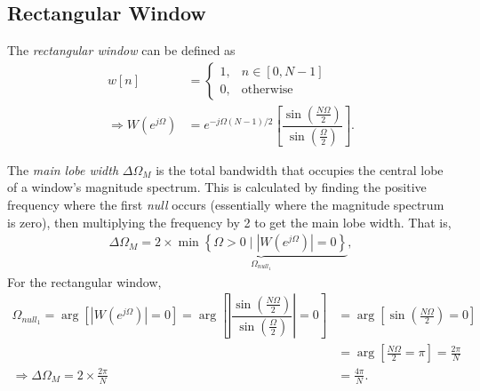 \documentclass{report}
\begin{document}
\subsection{Rectangular Window}
The \emph{rectangular window} can be defined as 
\begin{align}
    w[n] &= \begin{cases}
        1, & n\in[0,N-1] \\
        0, & \text{otherwise}
    \end{cases} \\
    \Longrightarrow W(e^{j\Omega}) &= e^{-j\Omega(N-1)/2}\left[\dfrac{\sin\left(\frac{N\Omega}{2}\right)}{\sin\left(\frac{\Omega}{2}\right)}\right].
\end{align}
\begin{center}
\end{center}
The \emph{main lobe width} $\Delta\Omega_M$ is the total bandwidth that occupies the central lobe of a window's magnitude spectrum. This is calculated by finding the positive frequency where the first \emph{null} occurs (essentially where the magnitude spectrum is zero), then 
multiplying the frequency by 2 to get the main lobe width. That is, 
\begin{align}
    \Delta\Omega_M = 2\times \underbrace{\min\left\{\Omega>0\mid |W(e^{j\Omega})|=0\right\}}_{\Omega_{null_1}},
\end{align}
For the rectangular window,
\begin{align*}
    \Omega_{null_1} = \arg [|W(e^{j\Omega})|=0] = \arg \left[\left|\dfrac{\sin\left(\frac{N\Omega}{2}\right)}{\sin\left(\frac{\Omega}{2}\right)}\right|=0\right] &= \arg \left[\sin\left(\frac{N\Omega}{2}\right)=0\right] \\ 
    &= \arg \left[\frac{N\Omega}{2}=\pi\right] = \frac{2\pi}{N} \\
    \Longrightarrow \Delta\Omega_M = 2 \times \frac{2\pi}{N} &= \frac{4\pi}{N}.
\end{align*}
\end{document}
